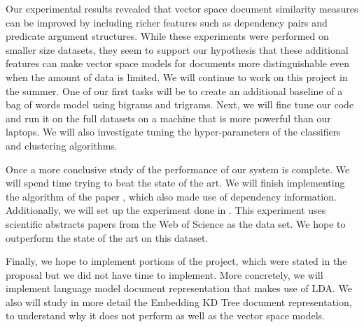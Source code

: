 \documentclass[11pt]{article}
\begin{document}
Our experimental results revealed that vector space document similarity measures can be improved by including richer features such as dependency pairs and predicate argument structures. While these experiments were performed on smaller size datasets, they seem to support our hypothesis that these additional features can make vector space models for documents more distinguishable even when the amount of data is limited. We will continue to work on this project in the summer. One of our first tasks will be to create an additional baseline of a bag of words model using bigrams and trigrams. Next, we will fine tune our code and run it on the full datasets on a machine that is more powerful than our laptops. We will also investigate tuning the hyper-parameters of the classifiers and clustering algorithms. 

Once a more conclusive study of the performance of our system is complete. We will spend time trying to beat the state of the art. We will finish implementing the algorithm of the paper \cite{Nastase2007}, which also made use of dependency information. Additionally, we will set up the experiment done in \cite{Hurtado2013}. This experiment uses scientific abstracts papers from the Web of Science as the data set. We hope to outperform the state of the art on this dataset. 

Finally, we hope to implement portions of the project, which were stated in the proposal but we did not have time to implement. More concretely, we will implement language model document representation that makes use of LDA. We also will study in more detail the Embedding KD Tree document representation, to understand why it does not perform  as well as the vector space models.  


\nocite{*}



  
  
\end{document}
